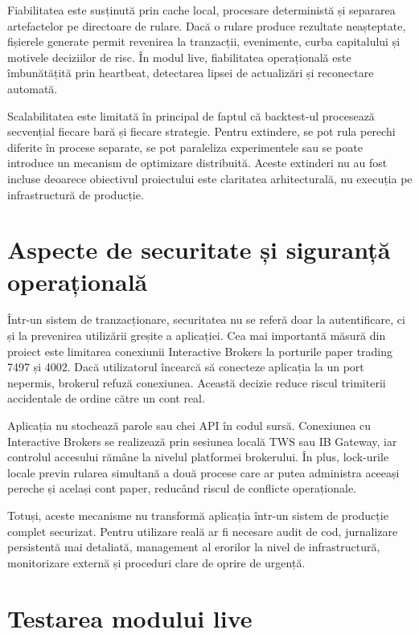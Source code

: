 Fiabilitatea este susținută prin cache local, procesare deterministă și separarea artefactelor pe directoare de rulare. Dacă o rulare produce rezultate neașteptate, fișierele generate permit revenirea la tranzacții, evenimente, curba capitalului și motivele deciziilor de risc. În modul live, fiabilitatea operațională este îmbunătățită prin heartbeat, detectarea lipsei de actualizări și reconectare automată.

Scalabilitatea este limitată în principal de faptul că backtest-ul procesează secvențial fiecare bară și fiecare strategie. Pentru extindere, se pot rula perechi diferite în procese separate, se pot paraleliza experimentele sau se poate introduce un mecanism de optimizare distribuită. Aceste extinderi nu au fost incluse deoarece obiectivul proiectului este claritatea arhitecturală, nu execuția pe infrastructură de producție.

\section{Aspecte de securitate și siguranță operațională}
\label{cap:cap4:securitate}

Într-un sistem de tranzacționare, securitatea nu se referă doar la autentificare, ci și la prevenirea utilizării greșite a aplicației. Cea mai importantă măsură din proiect este limitarea conexiunii Interactive Brokers la porturile paper trading 7497 și 4002. Dacă utilizatorul încearcă să conecteze aplicația la un port nepermis, brokerul refuză conexiunea. Această decizie reduce riscul trimiterii accidentale de ordine către un cont real.

Aplicația nu stochează parole sau chei API în codul sursă. Conexiunea cu Interactive Brokers se realizează prin sesiunea locală TWS sau IB Gateway, iar controlul accesului rămâne la nivelul platformei brokerului. În plus, lock-urile locale previn rularea simultană a două procese care ar putea administra aceeași pereche și același cont paper, reducând riscul de conflicte operaționale.

Totuși, aceste mecanisme nu transformă aplicația într-un sistem de producție complet securizat. Pentru utilizare reală ar fi necesare audit de cod, jurnalizare persistentă mai detaliată, management al erorilor la nivel de infrastructură, monitorizare externă și proceduri clare de oprire de urgență.

\section{Testarea modului live}
\label{cap:cap4:live}

